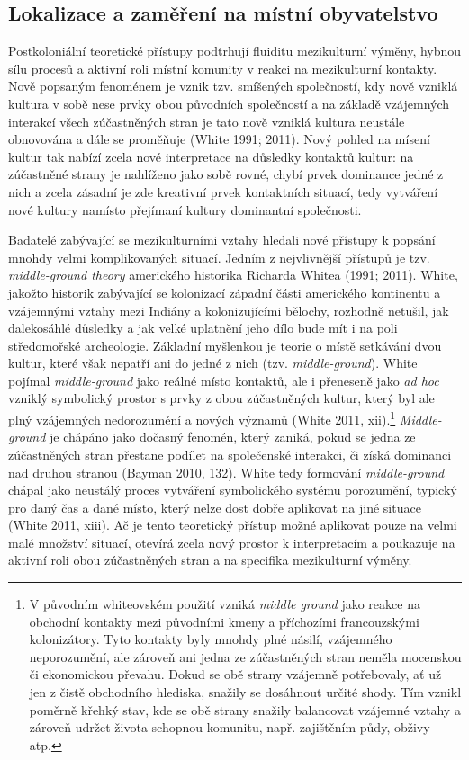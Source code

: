 \subsection[lokalizace-a-zaměření-na-místní-obyvatelstvo]{Lokalizace a zaměření na místní obyvatelstvo}

Postkoloniální teoretické přístupy podtrhují fluiditu mezikulturní výměny, hybnou sílu procesů a aktivní roli místní komunity v reakci na mezikulturní kontakty. Nově popsaným fenoménem je vznik tzv. smíšených společností, kdy nově vzniklá kultura v sobě nese prvky obou původních společností a na základě vzájemných interakcí všech zúčastněných stran je tato nově vzniklá kultura neustále obnovována a dále se proměňuje (White 1991; 2011). Nový pohled na mísení kultur tak nabízí zcela nové interpretace na důsledky kontaktů kultur: na zúčastněné strany je nahlíženo jako sobě rovné, chybí prvek dominance jedné z nich a zcela zásadní je zde kreativní prvek kontaktních situací, tedy vytváření nové kultury namísto přejímaní kultury dominantní společnosti.

Badatelé zabývající se mezikulturními vztahy hledali nové přístupy k popsání mnohdy velmi komplikovaných situací. Jedním z nejvlivnější přístupů je tzv. {\em middle-ground theory} amerického historika Richarda Whitea (1991; 2011). White, jakožto historik zabývající se kolonizací západní části amerického kontinentu a vzájemnými vztahy mezi Indiány a kolonizujícími bělochy, rozhodně netušil, jak dalekosáhlé důsledky a jak velké uplatnění jeho dílo bude mít i na poli středomořské archeologie. Základní myšlenkou je teorie o místě setkávání dvou kultur, které však nepatří ani do jedné z nich (tzv. {\em middle-ground}). White pojímal {\em middle-ground} jako reálné místo kontaktů, ale i přeneseně jako {\em ad hoc} vzniklý symbolický prostor s prvky z obou zúčastněných kultur, který byl ale plný vzájemných nedorozumění a nových významů (White 2011, xii).\footnote{V původním whiteovském použití vzniká {\em middle ground} jako reakce na obchodní kontakty mezi původními kmeny a příchozími francouzskými kolonizátory. Tyto kontakty byly mnohdy plné násilí, vzájemného neporozumění, ale zároveň ani jedna ze zúčastněných stran neměla mocenskou či ekonomickou převahu. Dokud se obě strany vzájemně potřebovaly, ať už jen z čistě obchodního hlediska, snažily se dosáhnout určité shody. Tím vznikl poměrně křehký stav, kde se obě strany snažily balancovat vzájemné vztahy a zároveň udržet života schopnou komunitu, např. zajištěním půdy, obživy atp.} {\em Middle-ground} je chápáno jako dočasný fenomén, který zaniká, pokud se jedna ze zúčastněných stran přestane podílet na společenské interakci, či získá dominanci nad druhou stranou (Bayman 2010, 132). White tedy formování {\em middle-ground} chápal jako neustálý proces vytváření symbolického systému porozumění, typický pro daný čas a dané místo, který nelze dost dobře aplikovat na jiné situace (White 2011, xiii). Ač je tento teoretický přístup možné aplikovat pouze na velmi malé množství situací, otevírá zcela nový prostor k interpretacím a poukazuje na aktivní roli obou zúčastněných stran a na specifika mezikulturní výměny.

